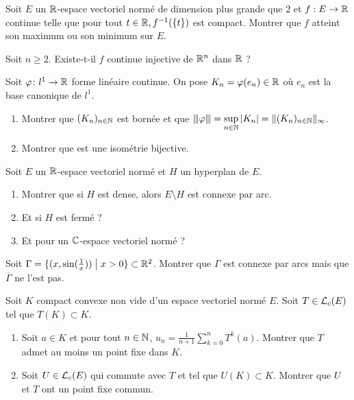 \documentclass[12pt]{article}
\begin{document}
\begin{exercise}
	Soit $E$ un $\mathbb{R}$-espace vectoriel normé de dimension plus grande que 2 et $f:E\to\mathbb{R}$ continue telle que pour tout $t\in\mathbb{R},f^{-1}(\{t\})$ est compact. Montrer que $f$ atteint son maximum ou son minimum sur $E$.
\end{exercise}

\begin{exercise}
	Soit $n\geqslant2$. Existe-t-il $f$ continue injective de $\mathbb{R}^{n}$ dans $\mathbb{R}$ ?
\end{exercise}

\begin{exercise}
	Soit $\varphi\colon l^{1}\to\mathbb{R}$ forme linéaire continue. On pose $K_{n}=\varphi(e_{n})\in\mathbb{R}$ où $e_{n}$ est la base canonique de $l^{1}$.
	\begin{enumerate}
		\item Montrer que $(K_{n})_{n\in\mathbb{N}}$ est bornée et que ${\left\vert\kern-0.25ex\left\vert\kern-0.25ex\left\vert{}\varphi \right\vert\kern-0.25ex\right\vert\kern-0.25ex\right\vert}=\sup\limits_{n\in\mathbb{N}}\vert K_{n}\vert=\Vert(K_{n})_{n\in\mathbb{N}}\Vert_{\infty}$.
		\item Montrer que 
		est une isométrie bijective.
	\end{enumerate}
\end{exercise}

\begin{exercise}
	Soit $E$ un $\mathbb{R}$-espace vectoriel normé et $H$ un hyperplan de $E$.
	\begin{enumerate}
		\item Montrer que si $H$ est dense, alors $E\setminus H$ est connexe par arc.
		\item Et si $H$ est fermé ?
		\item Et pour un $\mathbb{C}$-espace vectoriel normé ?
	\end{enumerate}
\end{exercise}

\begin{exercise}
	Soit $\Gamma=\{(x,\sin(\frac{1}{x}))\bigm| x>0\}\subset\mathbb{R}^{2}$. Montrer que $\Gamma$ est connexe par arcs mais que $\overline{\Gamma}$ ne l'est pas.
\end{exercise}

\begin{exercise}
	Soit $K$ compact convexe non vide d'un espace vectoriel normé $E$. Soit $T\in\mathcal{L}_{c}(E)$ tel que $T(K)\subset K$.
	\begin{enumerate}
		\item Soit $a\in K$ et pour tout $n\in\mathbb{N}$, $u_{n}=\frac{1}{n+1}\sum_{k=0}^{n}T^{k}(a)$. Montrer que $T$ admet au moins un point fixe dans $K$.
		\item Soit $U\in\mathcal{L}_{c}(E)$ qui commute avec $T$ et tel que $U(K)\subset K$. Montrer que $U$ et $T$ ont un point fixe commun.
	\end{enumerate}
\end{exercise}
\end{document}
